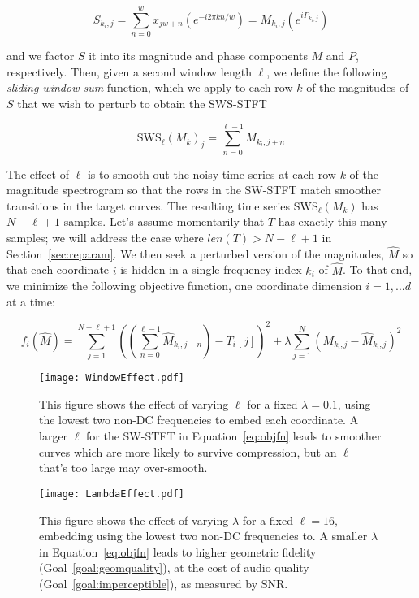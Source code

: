 \documentclass[runningheads]{llncs}
\begin{document}
\begin{equation}
  S_{k_i, j} = \sum_{n = 0}^w x_{jw + n} \left(e^{-i 2 \pi k n / w} \right) = M_{k_i, j} \left( e^{i P_{k_i, j}} \right)
\end{equation}

and we factor $S$ it into its magnitude and phase components $M$ and $P$, respectively.  Then, given a second window length $\ell$, we define the following {\em sliding window sum} function, which we apply to each row $k$ of the magnitudes of $S$ that we wish to perturb to obtain the SWS-STFT

\begin{equation}
  \text{SWS}_{\ell}\left({M_k}\right)_j = \sum_{n = 0}^{\ell-1} M_{k_i, j+n}
\end{equation}

The effect of $\ell$ is to smooth out the noisy time series at each row $k$ of the magnitude spectrogram so that the rows in the SW-STFT match smoother transitions in the target curves.  The resulting time series $\text{SWS}_{\ell}\left({M_k}\right)$ has $N-\ell+1$ samples.  Let's assume momentarily that $T$ has exactly this many samples; we will address the case where $len(T) > N-\ell+1$ in Section~\ref{sec:reparam}.  We then seek a perturbed version of the magnitudes, $\hat{M}$ so that each coordinate $i$ is hidden in a single frequency index $k_i$ of $\hat{M}$.  To that end, we minimize the following objective function, one coordinate dimension $i = 1, ... d$ at a time:

\begin{equation}
  \label{eq:objfn}
  f_i(\hat{M}) = \sum_{j=1}^{N-\ell+1} \left( \left( \sum_{n = 0}^{\ell-1} \hat{M}_{k_i, j+n} \right) - T_i[j] \right)^2 + \lambda \sum_{j=1}^N \left( M_{k_i, j} - \hat{M}_{k_i, j} \right)^2
\end{equation}



\begin{figure}
  \centering
  \texttt{[image: WindowEffect.pdf]}
  \caption{This figure shows the effect of varying $\ell$ for a fixed $\lambda=0.1$, using the lowest two non-DC frequencies to embed each coordinate.  A larger $\ell$ for the SW-STFT in Equation~\ref{eq:objfn} leads to smoother curves which are more likely to survive compression, but an $\ell$ that's too large may over-smooth.}
  \label{fig:WindowEffect}
\end{figure}

\begin{figure}
  \centering
  \texttt{[image: LambdaEffect.pdf]}
  \caption{This figure shows the effect of varying $\lambda$ for a fixed $\ell=16$, embedding using the lowest two non-DC frequencies to.  A smaller $\lambda$ in Equation~\ref{eq:objfn} leads to higher geometric fidelity (Goal~\ref{goal:geomquality}), at the cost of audio quality (Goal~\ref{goal:imperceptible}), as measured by SNR.}
  \label{fig:LambdaEffect}
\end{figure}
\end{document}
